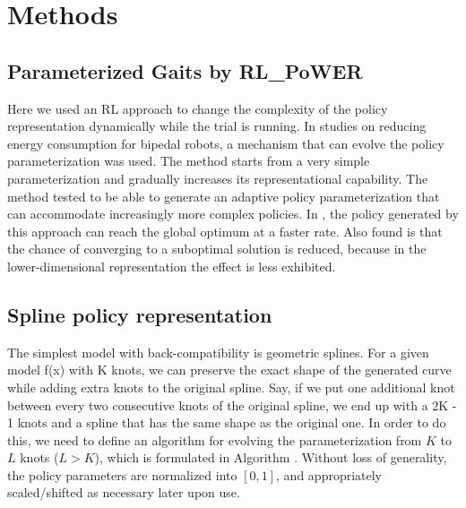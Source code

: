 \section{Methods}



\subsection{Parameterized Gaits by RL\_PoWER}

Here we used an RL approach to change the complexity of the policy
representation dynamically while the trial is running. In
\cite{kormushev2011bipedal-walking-energy} studies on reducing energy
consumption for bipedal robots, a mechanism that can
evolve the policy parameterization was used. The method starts from a
very simple parameterization and gradually increases its
representational capability. The method tested to be able to generate
an adaptive policy parameterization that can accommodate increasingly
more complex policies. In \cite{kormushev2011bipedal-walking-energy}, the policy
generated by this approach can reach the global optimum at a faster
rate. Also found is that the chance of converging to a suboptimal
solution is reduced, because in the lower-dimensional representation
the effect is less exhibited.



\subsection{Spline policy representation}

The simplest model with back-compatibility is geometric
splines. For a given model f(x) with K knots, we can preserve the
exact shape of the generated curve while adding extra knots to the
original spline. Say, if we put one additional knot between every two
consecutive knots of the original spline, we end up with a 2K - 1
knots and a spline that has the same shape as the original one. In
order to do this, we need to define an algorithm for evolving the
parameterization from $K$ to $L$ knots ($L > K$), which is formulated in
Algorithm .  Without loss of generality, the policy parameters are
normalized into $[0, 1]$, and appropriately scaled/shifted as necessary
later upon use.


